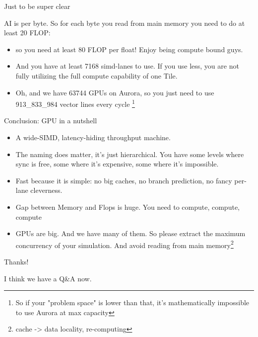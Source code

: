 \begin{frame}{Just to be super clear}

AI is per byte. So for each byte you read from main memory you need to do at least 20 FLOP:
\begin{itemize}
    \item so you need at least 80 FLOP per float!  Enjoy being compute bound guys.
    \item And you have at least 7168 simd-lanes to use. If you use less, you are not fully utilizing the full compute capability of one Tile.
    \item Oh, and we have 63744 GPUs on Aurora, so you just need to use 913\_833\_984 vector lines every cycle \footnote{So if your "problem space" is lower than that, it's mathematically impossible to use Aurora at max capacity}
\end{itemize}


\end{frame}

\begin{frame}{Conclusion: GPU in a nutshell}
\begin{itemize}
    \item A wide-SIMD, latency-hiding throughput machine.
    \item The naming does matter, it's just hierarchical. You have some levels where sync is free, some where it's expensive, some where it's impossible.
    \item Fast because it is simple: no big caches, no branch prediction,
          no fancy per-lane cleverness.
    \item Gap between Memory and Flops is huge. You need to compute, compute, compute
    \item GPUs are big. And we have many of them. So please extract the maximum concurrency of your simulation. And avoid reading from main memory\footnote{cache -> data locality, re-computing}
\end{itemize}

\end{frame}

\begin{frame}{Thanks!}

I think we have a Q\&A now. 
\end{frame}

